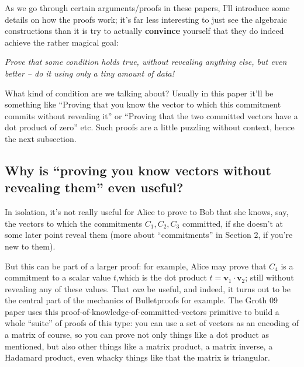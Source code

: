 \documentclass[10pt,a4paper]{article}
\begin{document}
As we go through certain arguments/proofs in these papers, I'll
introduce some details on how the proofs work; it's far less interesting
to just see the algebraic constructions than it is try to actually
\textbf{convince} yourself that they do indeed achieve the rather
magical goal:

\emph{Prove that some condition holds true, without revealing anything
else, but even better -- do it using only a tiny amount of data!}

What kind of condition are we talking about? Usually in this paper it'll
be something like ``Proving that you know the vector to which this
commitment commits without revealing it'' or ``Proving that the two
committed vectors have a dot product of zero'' etc. Such proofs are a
little puzzling without context, hence the next subsection.

\hypertarget{why-is-proving-you-know-vectors-without-revealing-them-even-useful}{%
\subsection[Why is ``proving you know vectors without revealing them''
even useful?]{\texorpdfstring{\protect\hypertarget{anchor-9}{}{}Why is
``proving you know vectors without revealing them'' even
useful?}{Why is ``proving you know vectors without revealing them'' even useful?}}\label{why-is-proving-you-know-vectors-without-revealing-them-even-useful}}

In isolation, it's not really useful for Alice to prove to Bob that she
knows, say, the vectors to which the commitments $C_1, C_2, C_3$ committed, if she
doesn't at some later point reveal them (more about ``commitments'' in
Section 2, if you're new to them).

But this can be part of a larger proof: for example, Alice may prove
that $C_4$ is a commitment to a scalar value $t$,which is the dot product $t=\textbf{v}_1 \cdot \textbf{v}_2$; still
without revealing any of these values. That \emph{can} be useful, and
indeed, it turns out to be the central part of the mechanics of
Bulletproofs for example. The Groth 09 paper uses this
proof-of-knowledge-of-committed-vectors primitive to build a whole
``suite'' of proofs of this type: you can use a set of vectors as an
encoding of a matrix of course, so you can prove not only things like a
dot product as mentioned, but also other things like a matrix product, a
matrix inverse, a Hadamard product, even whacky things like that the
matrix is triangular.
\end{document}
